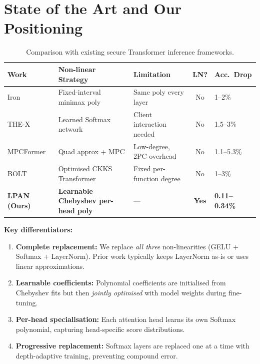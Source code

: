 \documentclass[12pt, a4paper]{article}
\begin{document}
\section{State of the Art and Our Positioning}

\begin{table}[ht]
\centering
\caption{Comparison with existing secure Transformer inference frameworks.}
\label{tab:related}
\renewcommand{\arraystretch}{1.3}
\begin{tabularx}{\textwidth}{lXXcl}
\toprule
\textbf{Work} & \textbf{Non-linear Strategy} & \textbf{Limitation} & \textbf{LN?} & \textbf{Acc.\ Drop} \\
\midrule
Iron~\cite{iron}    & Fixed-interval minimax poly & Same poly every layer     & No & 1--2\% \\
THE-X~\cite{thex}   & Learned Softmax network     & Client interaction needed & No & 1.5--3\% \\
MPCFormer~\cite{mpcformer} & Quad approx + MPC    & Low-degree, 2PC overhead  & No & 1.1--5.3\% \\
BOLT~\cite{bolt}    & Optimised CKKS Transformer  & Fixed per-function degree & No & 1--3\% \\
\rowcolor{green!8}
\textbf{LPAN (Ours)} & \textbf{Learnable Chebyshev per-head poly} & --- & \textbf{Yes} & \textbf{0.11--0.34\%} \\
\bottomrule
\end{tabularx}
\end{table}

\noindent\textbf{Key differentiators:}
\begin{enumerate}[leftmargin=2em]
  \item \textbf{Complete replacement:} We replace \emph{all three} non-linearities (GELU + Softmax + LayerNorm). Prior work typically keeps LayerNorm as-is or uses linear approximations.
  \item \textbf{Learnable coefficients:} Polynomial coefficients are initialised from Chebyshev fits but then \emph{jointly optimised} with model weights during fine-tuning.
  \item \textbf{Per-head specialisation:} Each attention head learns its own Softmax polynomial, capturing head-specific score distributions.
  \item \textbf{Progressive replacement:} Softmax layers are replaced one at a time with depth-adaptive training, preventing compound error.
\end{enumerate}
\end{document}
